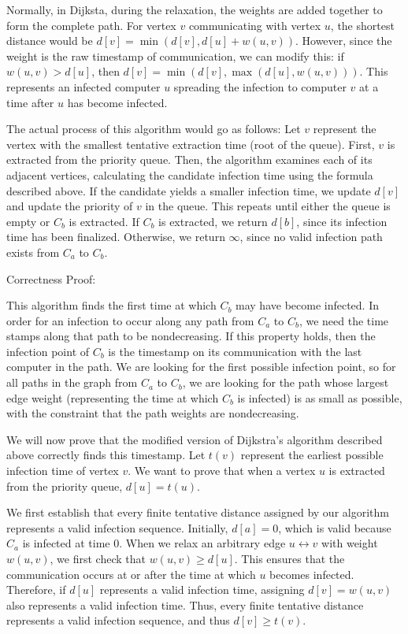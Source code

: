 \documentclass[11pt]{article}
\begin{document}
Normally, in Dijksta, during the relaxation, the weights are added together to form the complete path. For vertex $v$ communicating with vertex $u$, 
the shortest distance would be $d[v] = \min(d[v], d[u] + w(u, v))$. However, since the weight is the raw timestamp of communication, we can modify this: 
if $w(u, v) > d[u]$, then $d[v] = \min(d[v], \max(d[u], w(u, v)))$. This represents an infected computer $u$ spreading the infection to 
computer $v$ at a time after $u$ has become infected. 

The actual process of this algorithm would go as follows: Let $v$ represent the vertex with the smallest tentative extraction time (root of the queue). 
First, $v$ is extracted from the priority queue. Then, the algorithm examines each of its adjacent vertices, 
calculating the candidate infection time using the formula described above. If the candidate yields a smaller infection time, we update $d[v]$ 
and update the priority of $v$ in the queue. This repeats until either the queue is empty or $C_b$ is extracted. 
If $C_b$ is extracted, we return $d[b]$, since its infection time has been finalized. Otherwise, we return $\infty$, 
since no valid infection path exists from $C_a$ to $C_b$.

\bigbreak

Correctness Proof:

This algorithm finds the first time at which $C_b$ may have become infected. In order for an infection to occur along any path from $C_a$ to $C_b$, 
we need the time stamps along that path to be nondecreasing. If this property holds, then the infection point of $C_b$ is the timestamp on its 
communication with the last computer in the path. We are looking for the first possible infection point, so for all paths in the graph from $C_a$ to 
$C_b$, we are looking for the path whose largest edge weight (representing the time at which $C_b$ is infected) is as small as possible, 
with the constraint that the path weights are nondecreasing. 

We will now prove that the modified version of Dijkstra's algorithm described above correctly finds this timestamp. 
Let $t(v)$ represent the earliest possible infection time of vertex $v$. We want to prove that when a vertex $u$ is extracted from the priority queue, 
$d[u] = t(u)$.

We first establish that every finite tentative distance assigned by our algorithm represents a valid infection sequence. 
Initially, $d[a] = 0$, which is valid because $C_a$ is infected at time 0. When we relax an arbitrary edge $u \leftrightarrow v$ with weight $w(u, v)$, 
we first check that $w(u, v) \geq d[u]$. This ensures that the communication occurs at or after the time at which $u$ becomes infected. 
Therefore, if $d[u]$ represents a valid infection time, assigning $d[v] = w(u, v)$ also represents a valid infection time. 
Thus, every finite tentative distance represents a valid infection sequence, and thus $d[v] \geq t(v)$.
\end{document}
